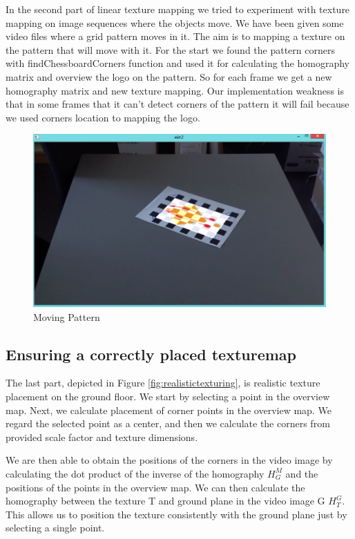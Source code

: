 In the second part of linear texture mapping we tried to experiment with texture mapping on image sequences where the objects move. We have been given some video files where a grid pattern moves in it. The aim is to mapping a texture on the pattern that will move with it. For the start we found the pattern corners with findChessboardCorners function and used it for calculating the homography matrix and overview the logo on the pattern. So for each frame we get a new homography matrix and new texture mapping. Our implementation weakness is that in some frames that it can’t detect corners of the pattern it will fail because we used corners location to mapping the logo.

\begin{figure}[h!]
	\centering
	\includegraphics[width=\textwidth]{Handin2/images/linearmapping2.jpg}
	\caption{Moving Pattern}
	\label{fig:movingpattern}
\end{figure}

\subsection{Ensuring a correctly placed texturemap}

The last part, depicted in Figure \ref{fig:realistictexturing}, is realistic texture placement on the ground floor. We start by selecting a point in the overview map. Next, we calculate placement of corner points in the overview map. We regard the selected point as a center, and then we calculate the corners from provided scale factor and texture dimensions.

We are then able to obtain the positions of the corners in the video image by calculating the dot product of the inverse of the homography $H_{G}^{M}$ and the positions of the points in the overview map. We can then calculate the homography between the texture T and ground plane in the video image G $H_{T}^{G}$. This allows us to position the texture consistently with the ground plane just by selecting a single point.

